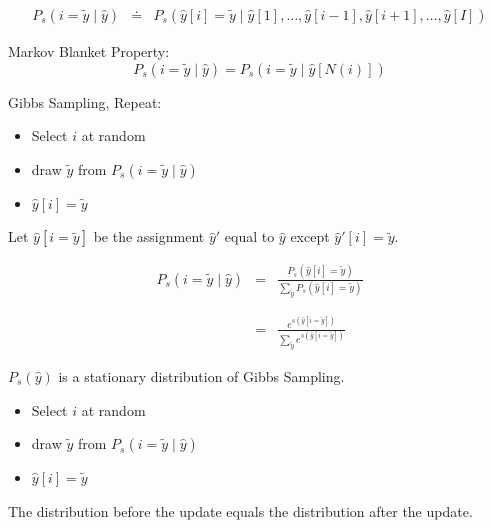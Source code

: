 {

\begin{eqnarray*}
  P_s(i=\tilde{y} \;|\;\hat{y}) & \doteq & P_s(\hat{y}[i] = \tilde{y}\;|\;\hat{y}[1],\ldots,\hat{y}[i-1],\hat{y}[i+1],\ldots,\hat{y}[I])
\end{eqnarray*}

\vfill
Markov Blanket Property:
$$P_s(i=\tilde{y} \;|\;\hat{y}) = P_s(i=\tilde{y} \;|\;\hat{y}[N(i)])$$
  
\vfill
Gibbs Sampling, Repeat:

\begin{itemize}
\item   Select $i$ at random

\item draw $\tilde{y}$ from $P_s(i = \tilde{y} \;|\;\hat{y})$

\item $\hat{y}[i] = \tilde{y}$
\end{itemize}


Let $\hat{y}[i = \tilde{y}]$ be the assignment $\hat{y}'$ equal to $\hat{y}$ except $\hat{y}'[i] = \tilde{y}$.

\vfill
\begin{eqnarray*}
 P_s(i = \tilde{y} \;|\; \hat{y})  & = & \frac{P_s(\hat{y}[i] = \tilde{y})}{\sum_{\tilde{y}} P_s(\hat{y}[i] = \tilde{y})} \\
  \\
  \\
  & = & \frac{e^{s(\hat{y}[i = \tilde{y}])}}{\sum_{\tilde{y}} e^{s(\hat{y}[i = \tilde{y}])}}
\end{eqnarray*}


$P_s(\hat{y})$ is a stationary distribution of Gibbs Sampling.

\vfill
\begin{itemize}
\item   Select $i$ at random

\item draw $\tilde{y}$ from $P_s(i = \tilde{y} \;|\;\hat{y})$

\item $\hat{y}[i] = \tilde{y}$
\end{itemize}


\vfill
The distribution before the update equals the distribution after the update.


}
